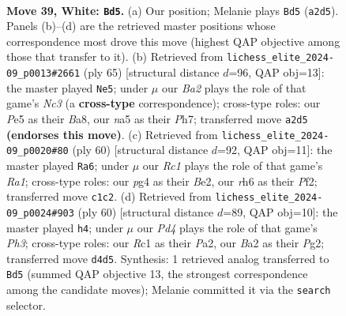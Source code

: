 \documentclass[11pt]{article}
\begin{document}
\clearpage

\begin{figure}[p]\centering
\begin{subfigure}{0.46\textwidth}\centering
\resizebox{\linewidth}{!}{%
\newchessgame
\chessboard[
  setfen={3qn3/3b2k1/p6r/n3Pp1p/PQ1P2p1/N7/B4PPP/2R1K1N1 w - - 0 39},
  showmover=false,
  pgfstyle=straightmove, color=movearrow, markmove={a2-d5}
]}
\caption{}
\end{subfigure}\hfill
\begin{subfigure}{0.46\textwidth}\centering
\resizebox{\linewidth}{!}{%
\newchessgame
\chessboard[
  setfen={b3r1k1/4q2p/p1npp1pQ/1p6/4P1B1/P1P4P/2PN1RP1/7K b - - 0 33},
  showmover=false,
  pgfstyle=straightmove, color=movearrow, markmove={c6-e5}
]}
\caption{}
\end{subfigure}
\\[4pt]
\begin{subfigure}{0.46\textwidth}\centering
\resizebox{\linewidth}{!}{%
\newchessgame
\chessboard[
  setfen={2r3k1/4qp2/2p1nbpp/1p2p3/1P2P3/1QP2NP1/4BPP1/R5K1 w - - 2 31},
  showmover=false,
  pgfstyle=straightmove, color=movearrow, markmove={a1-a6}
]}
\caption{}
\end{subfigure}\hfill
\begin{subfigure}{0.46\textwidth}\centering
\resizebox{\linewidth}{!}{%
\newchessgame
\chessboard[
  setfen={2q3k1/5pp1/pQ1Bn1bp/3p4/8/2PnP1NP/P4PP1/6K1 w - - 1 31},
  showmover=false,
  pgfstyle=straightmove, color=movearrow, markmove={h3-h4}
]}
\caption{}
\end{subfigure}
\caption{\textbf{Move 39, White: \texttt{Bd5}.} (a) Our position; Melanie plays \texttt{Bd5} (\texttt{a2d5}). Panels (b)--(d) are the retrieved master positions whose correspondence most drove this move (highest QAP objective among those that transfer to it). (b) Retrieved from \texttt{lichess\_elite\_2024-09\_p0013\#2661} (ply 65) [structural distance $d$=96, QAP obj=13]: the master played \texttt{Ne5}; under $\mu$ our \emph{Ba2} plays the role of that game's \emph{Nc3} (a \textbf{cross-type} correspondence); cross-type roles: our \emph{P}e5 as their \emph{B}a8, our \emph{n}a5 as their \emph{P}h7; transferred move \texttt{a2d5} \textbf{(endorses this move)}. (c) Retrieved from \texttt{lichess\_elite\_2024-09\_p0020\#80} (ply 60) [structural distance $d$=92, QAP obj=11]: the master played \texttt{Ra6}; under $\mu$ our \emph{Rc1} plays the role of that game's \emph{Ra1}; cross-type roles: our \emph{p}g4 as their \emph{B}e2, our \emph{r}h6 as their \emph{P}f2; transferred move \texttt{c1c2}. (d) Retrieved from \texttt{lichess\_elite\_2024-09\_p0024\#903} (ply 60) [structural distance $d$=89, QAP obj=10]: the master played \texttt{h4}; under $\mu$ our \emph{Pd4} plays the role of that game's \emph{Ph3}; cross-type roles: our \emph{R}c1 as their \emph{P}a2, our \emph{B}a2 as their \emph{P}g2; transferred move \texttt{d4d5}. Synthesis: 1 retrieved analog transferred to \texttt{Bd5} (summed QAP objective 13, the strongest correspondence among the candidate moves); Melanie committed it via the \texttt{search} selector.}
\label{fig:thought-m76}
\end{figure}
\end{document}
